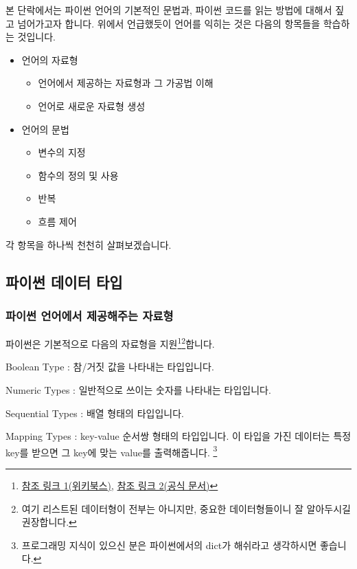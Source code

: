 \documentclass[twoside]{article}
\begin{document}
본 단락에서는 파이썬 언어의 기본적인 문법과, 파이썬 코드를 읽는 방법에 대해서 짚고 넘어가고자 합니다. 위에서 언급했듯이 언어를 익히는 것은 다음의 항목들을 학습하는 것입니다. 

\begin{itemize} 
\item 언어의 자료형 
\begin{itemize}
\item 언어에서 제공하는 자료형과 그 가공법 이해 
\item 언어로 새로운 자료형 생성
\end{itemize} 
\item 언어의 문법 
\begin{itemize} 
\item 변수의 지정 
\item 함수의 정의 및 사용 
\item 반복 
\item 흐름 제어
\end{itemize}
\end{itemize}

각 항목을 하나씩 천천히 살펴보겠습니다. 

\subsection{파이썬 데이터 타입} 

\subsubsection{파이썬 언어에서 제공해주는 자료형} 

파이썬은 기본적으로 다음의 자료형을 지원\footnote{\href{https://en.wikibooks.org/wiki/Python\_Programming/Data\_Types}{참조 링크 1(위키북스)}, \href{https://docs.python.org/3/library/stdtypes.html}{참조 링크 2(공식 문서)}}\footnote{여기 리스트된 데이터형이 전부는 아니지만, 중요한 데이터형들이니 잘 알아두시길 권장합니다.}합니다. 

\begin{compactitem} 
\item Boolean Type : 참/거짓 값을 나타내는 타입입니다. 
\item Numeric Types : 일반적으로 쓰이는 숫자를 나타내는 타입입니다. 
\item Sequential Types : 배열 형태의 타입입니다. 
\item Mapping Types : key-value 순서쌍 형태의 타입입니다. 이 타입을 가진 데이터는 특정 key를 받으면 그 key에 맞는 value를 출력해줍니다. \footnote{프로그래밍 지식이 있으신 분은 파이썬에서의 dict가 해쉬라고 생각하시면 좋습니다.}
\end{compactitem}
\end{document}
